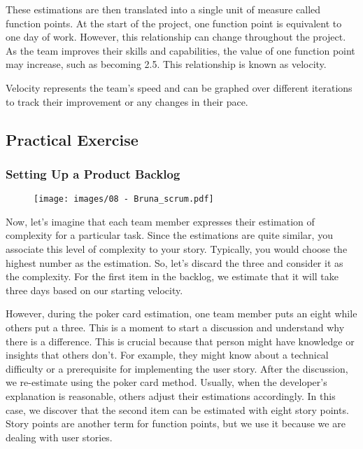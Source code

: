 These estimations are then translated into a single unit of measure
called function points. At the start of the project, one function point
is equivalent to one day of work. However, this relationship can change
throughout the project. As the team improves their skills and
capabilities, the value of one function point may increase, such as
becoming 2.5. This relationship is known as velocity.

Velocity represents the team's speed and can be graphed over different
iterations to track their improvement or any changes in their pace.

\subsection{Practical Exercise}

\subsubsection{Setting Up a Product Backlog}

\begin{figure}[!h]
    \centering
    \texttt{[image: images/08 - Bruna\_scrum.pdf]}
\end{figure}

Now, let's imagine that each team member expresses their estimation of
complexity for a particular task. Since the estimations are quite
similar, you associate this level of complexity to your story.
Typically, you would choose the highest number as the estimation. So,
let's discard the three and consider it as the complexity. For the first
item in the backlog, we estimate that it will take three days based on
our starting velocity.

However, during the poker card estimation, one team member puts an eight
while others put a three. This is a moment to start a discussion and
understand why there is a difference. This is crucial because that
person might have knowledge or insights that others don't. For example,
they might know about a technical difficulty or a prerequisite for
implementing the user story. After the discussion, we re-estimate using
the poker card method. Usually, when the developer's explanation is
reasonable, others adjust their estimations accordingly. In this case,
we discover that the second item can be estimated with eight story
points. Story points are another term for function points, but we use it
because we are dealing with user stories.

